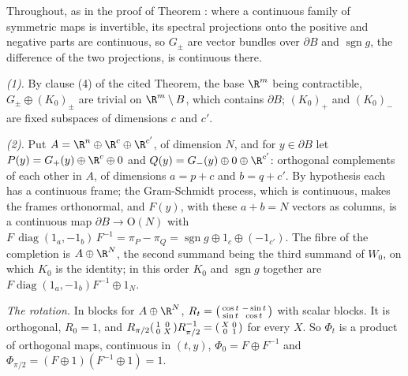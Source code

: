 Throughout, as in the proof of Theorem : where a continuous family of symmetric maps is invertible, its spectral projections onto the positive and negative parts are continuous, so $G_{\pm}$ are vector bundles over $\partial B$ and $\operatorname{sgn} g$, the difference of the two projections, is continuous there.

\emph{(1).} By clause (4) of the cited Theorem, the base $\R^{m}$ being contractible, $G_{\pm} \oplus (K_{0})_{\pm}$ are trivial on $\R^{m} \setminus B$, which contains $\partial B$; $(K_{0})_{+}$ and $(K_{0})_{-}$ are fixed subspaces of dimensions $c$ and $c'$.

\emph{(2).} Put $A = \R^{n} \oplus \R^{c} \oplus \R^{c'}$, of dimension $N$, and for $y \in \partial B$ let $P(y) = G_{+}(y) \oplus \R^{c} \oplus 0$ and $Q(y) = G_{-}(y) \oplus 0 \oplus \R^{c'}$: orthogonal complements of each other in $A$, of dimensions $a = p + c$ and $b = q + c'$. By hypothesis each has a continuous frame; the Gram-Schmidt process, which is continuous, makes the frames orthonormal, and $F(y)$, with these $a + b = N$ vectors as columns, is a continuous map $\partial B \to \mathrm{O}(N)$ with $F\,\operatorname{diag}(1_{a}, -1_{b})\,F^{-1} = \pi_{P} - \pi_{Q} = \operatorname{sgn} g \oplus 1_{c} \oplus (-1_{c'})$. The fibre of the completion is $A \oplus \R^{N}$, the second summand being the third summand of $W_{0}$, on which $K_{0}$ is the identity; in this order $K_{0}$ and $\operatorname{sgn} g$ together are $F\operatorname{diag}(1_{a}, -1_{b})F^{-1} \oplus 1_{N}$.

\emph{The rotation.} In blocks for $A \oplus \R^{N}$, $R_{t} = \begin{psmallmatrix} \cos t & -\sin t \\ \sin t & \cos t\end{psmallmatrix}$ with scalar blocks. It is orthogonal, $R_{0} = 1$, and $R_{\pi/2}\begin{psmallmatrix} 1 & 0 \\ 0 & X\end{psmallmatrix}R_{\pi/2}^{-1} = \begin{psmallmatrix} X & 0 \\ 0 & 1\end{psmallmatrix}$ for every $X$. So $\Phi_{t}$ is a product of orthogonal maps, continuous in $(t, y)$, $\Phi_{0} = F \oplus F^{-1}$ and $\Phi_{\pi/2} = (F \oplus 1)(F^{-1} \oplus 1) = 1$.

